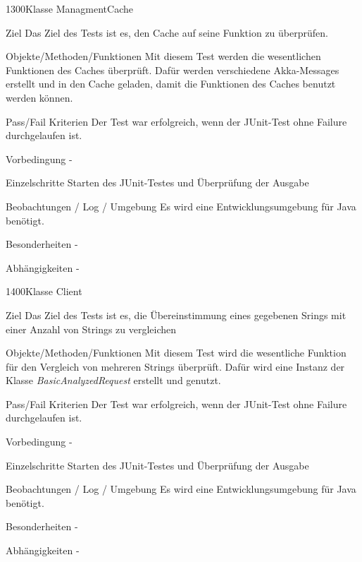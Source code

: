 \begin{testcase}{1300}{Klasse ManagmentCache}
\item[Ziel] Das Ziel des Tests ist es, den Cache auf seine Funktion zu
überprüfen.
\item[Objekte/Methoden/Funktionen] Mit diesem Test werden die wesentlichen
Funktionen des Caches überprüft.
Dafür werden verschiedene Akka-Messages erstellt und in den Cache geladen, damit
die Funktionen des Caches benutzt werden können.
\item[Pass/Fail Kriterien] Der Test war erfolgreich, wenn der JUnit-Test ohne
Failure durchgelaufen ist.
\item[Vorbedingung] -
\item[Einzelschritte] Starten des JUnit-Testes und Überprüfung der Ausgabe 
\item[Beobachtungen / Log / Umgebung] Es wird eine Entwicklungsumgebung für Java
benötigt.
\item[Besonderheiten] -
\item[Abhängigkeiten] -
\end{testcase}

\begin{testcase}{1400}{Klasse Client}
\item[Ziel] Das Ziel des Tests ist es, die Übereinstimmung eines gegebenen
Srings mit einer Anzahl von Strings zu vergleichen
\item[Objekte/Methoden/Funktionen] Mit diesem Test wird die wesentliche
Funktion für den Vergleich von mehreren Strings überprüft.
Dafür wird eine Instanz der Klasse \textit{BasicAnalyzedRequest} erstellt und
genutzt.
\item[Pass/Fail Kriterien] Der Test war erfolgreich, wenn der JUnit-Test ohne
Failure durchgelaufen ist.
\item[Vorbedingung] -
\item[Einzelschritte] Starten des JUnit-Testes und Überprüfung der Ausgabe 
\item[Beobachtungen / Log / Umgebung] Es wird eine Entwicklungsumgebung für Java
benötigt.
\item[Besonderheiten] -
\item[Abhängigkeiten] -
\end{testcase}